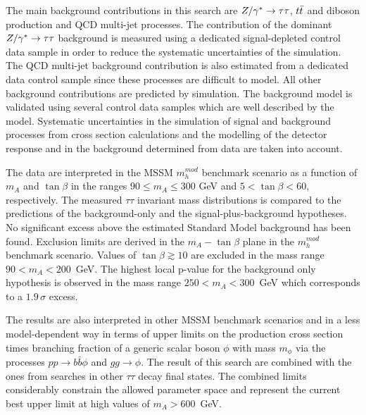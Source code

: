 The main background contributions in this search are $Z/\gamma^*\rightarrow \tau\tau$, $t\bar{t}$ and  diboson production and QCD multi-jet processes.
The contribution of the dominant $Z/\gamma^*\rightarrow \tau\tau$ background is measured using a dedicated  signal-depleted control data sample
in order to reduce the systematic uncertainties of the simulation. The QCD multi-jet background contribution 
is also estimated from a dedicated data control sample since these processes are difficult to model. All  other 
background contributions are predicted by simulation. 
The background model is validated using several control data samples which are well described by the model.
Systematic uncertainties in the simulation of signal and background processes
from cross section calculations and the modelling of the detector response and in the 
background determined from  data are taken into account.

The data are interpreted in the MSSM $m_h^{mod}$ benchmark scenario as a function of $m_A$ and $ \tan\beta$
in the ranges $90 \leq m_A \leq 300$ GeV and $5 < \tan\beta < 60$, respectively.
The measured $\tau\tau$ invariant mass distributions is compared to the predictions of the  background-only and the
signal-plus-background hypotheses. No significant excess above the estimated Standard 
Model background has been found. Exclusion limits are derived in the $m_A - \tan\beta$ plane 
in the $m_h^{mod}$ benchmark scenario. Values of $\tan\beta \apprge 10$ are excluded 
in the mass range $90 < m_A < 200$~GeV. The highest local p-value for the background only hypothesis 
is observed in the mass range $250< m_A <300$~GeV which corresponds to a $1.9\,\sigma$ excess.

The results  are also interpreted in other MSSM benchmark scenarios and in a  less model-dependent 
way in terms of upper limits on the production cross section times branching fraction 
of a generic scalar boson $\phi$ with  mass  $m_\phi$ via the  processes 
$pp \rightarrow b\bar{b}\phi$ and $gg \rightarrow \phi$.
The result of this search are  combined with the ones from  searches in other $\tau\tau$ 
decay final states. The combined limits considerably constrain
the allowed parameter space and represent the current best upper limit at  high values of $m_A > 600$~GeV. 

